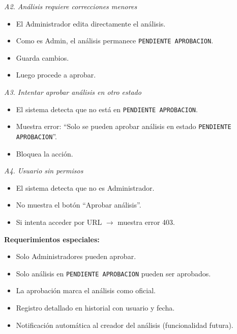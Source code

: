 \vspace{0.3em}
\noindent\textit{A2. Análisis requiere correcciones menores}
\begin{itemize}[nosep]
    \item El Administrador edita directamente el análisis.
    \item Como es Admin, el análisis permanece \texttt{PENDIENTE APROBACION}.
    \item Guarda cambios.
    \item Luego procede a aprobar.
\end{itemize}

\vspace{0.3em}
\noindent\textit{A3. Intentar aprobar análisis en otro estado}
\begin{itemize}[nosep]
    \item El sistema detecta que no está en \texttt{PENDIENTE APROBACION}.
    \item Muestra error: ``Solo se pueden aprobar análisis en estado \texttt{PENDIENTE APROBACION}''.
    \item Bloquea la acción.
\end{itemize}

\vspace{0.3em}
\noindent\textit{A4. Usuario sin permisos}
\begin{itemize}[nosep]
    \item El sistema detecta que no es Administrador.
    \item No muestra el botón ``Aprobar análisis''.
    \item Si intenta acceder por URL $\rightarrow$ muestra error 403.
\end{itemize}

\vspace{0.5em}
\noindent\textbf{Requerimientos especiales:}
\begin{itemize}[nosep]
    \item Solo Administradores pueden aprobar.
    \item Solo análisis en \texttt{PENDIENTE APROBACION} pueden ser aprobados.
    \item La aprobación marca el análisis como oficial.
    \item Registro detallado en historial con usuario y fecha.
    \item Notificación automática al creador del análisis (funcionalidad futura).
\end{itemize}
